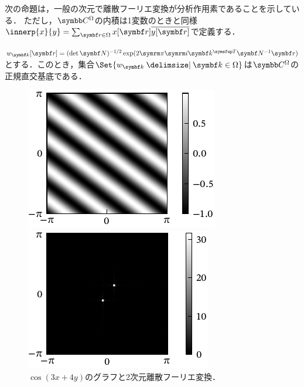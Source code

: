\documentclass[../../main]{subfiles}
\begin{document}
次の命題は，一般の次元で離散フーリエ変換が分析作用素であることを示している．
ただし，\(\numset{C}^\Omega\)の内積は1変数のときと同様\(\innerp{x}{y}=\sum_{\vect{r}\in\Omega}x[\vect{r}]\conj*{y[\vect{r}]}\)で定義する．

\begin{proposition}{}{}
  \(w_{\vect{k}}[\vect{r}]=(\det\mat{N})^{-1/2}\exp(2\krez\iuni\trps{\vect{k}}\mat{N}^{-1}\vect{r})\)とする．このとき，集合\(\Set{w_{\vect{k}}\given\vect{k}\in\Omega}\)は\(\numset{C}^\Omega\)の正規直交基底である．
\end{proposition}

\begin{figure}[htbp]
  \begin{minipage}{\linewidth/2}
    \centering
    \includegraphics{figures/2dcos.pdf}
    \end{minipage}%
  \begin{minipage}{\linewidth/2}
    \centering
    \includegraphics{figures/2dcos_dft.pdf}
  \end{minipage}
  \caption{\(\cos(3x+4y)\)のグラフと2次元離散フーリエ変換．}
\end{figure}
\end{document}
